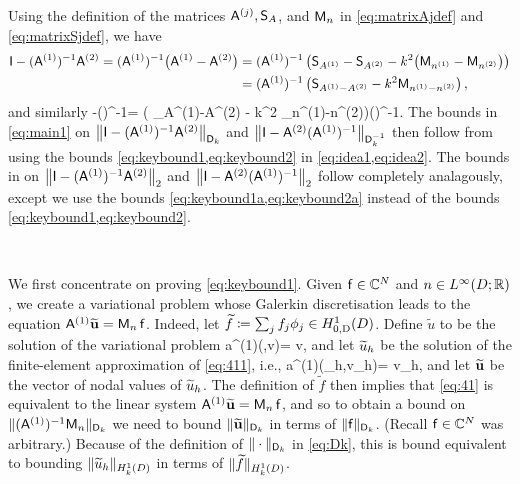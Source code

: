 Using the definition of the matrices $\mathsf{A}^{(j)}, \mathsf{S}_{A}$, and $\mathsf{M}_{n}$ in \cref{eq:matrixAjdef} and \cref{eq:matrixSjdef}, we have
\begin{align}\nonumber
\mathsf{I} - (\mathsf{A}^{(1)})^{-1}\mathsf{A}^{(2)} = (\mathsf{A}^{(1)})^{-1}\big(\mathsf{A}^{(1)}-\mathsf{A}^{(2)}\big) &=  (\mathsf{A}^{(1)})^{-1}\left( \mathsf{S}_{A^{(1)}} - \mathsf{S}_{A^{(2)}} - k^2 \big(\mathsf{M}_{n^{(1)}}-\mathsf{M}_{n^{(2)}}\big)\right)\\
&= (\mathsf{A}^{(1)})^{-1}\left( \mathsf{S}_{A^{(1)}-A^{(2)}} - k^2 \mathsf{M}_{n^{(1)}-n^{(2)}}\right),\label{eq:idea1}
\end{align}
and similarly 
\beq\label{eq:idea2}
\Imat -\Amatt  (\Amato)^{-1}= \left( \Smat_{A^{(1)}-A^{(2)}} - k^2 \Mmat_{n^{(1)}-n^{(2)}}\right)(\Amato)^{-1}.
\eeq
The bounds in  \cref{eq:main1} on $\NDk{\Imat - (\Amato)^{-1}\Amatt}$ and  $\NDkI{\Imat - \Amatt(\Amato)^{-1}}$ then follow from using the bounds \cref{eq:keybound1,eq:keybound2} in \cref{eq:idea1,eq:idea2}. The bounds in  on $\Nt{\Imat - (\Amato)^{-1}\Amatt}$ and  $\Nt{\Imat - \Amatt(\Amato)^{-1}}$ follow completely analagously, except we use the bounds \cref{eq:keybound1a,eq:keybound2a} instead of the bounds \cref{eq:keybound1,eq:keybound2}.
%
\epf

\

We first concentrate on proving \cref{eq:keybound1}.
Given $\mathsf{f} \in \mathbb C^N$ and $n\in \LiDRR$, we create a variational problem whose Galerkin discretisation leads to the equation $\mathsf{A}^{(1)} \widetilde{\mathbf{u}} = \mathsf{M}_n\,\mathsf{f}$.
Indeed, let $\widetilde{f} \de \sum_j f_j \phi_j\in \HozDD$. Define $\widetilde{u}$ to be the solution of the variational problem 
\beq\label{eq:411}
a^{(1)}(,v)=  \quad{} v\in \HozDD,
\eeq
and let $\widetilde{u}_h$ be the solution of the finite-element approximation of \cref{eq:411}, i.e.,
\beq\label{eq:41}
a^{(1)}(\tu_h,v_h)=  \quad{} v_h\in \Vhp,
\eeq
and let $\widetilde{\mathbf{u}}$ be the vector of nodal values of $\widetilde{u}_h$. The definition of $\widetilde{f}$ then implies that \cref{eq:41} is equivalent to the linear system $\mathsf{A}^{(1)} \widetilde{\mathbf{u}} = \mathsf{M}_{n}\,\mathsf{f}$, and so to obtain a bound on $\|(\mathsf{A}^{(1)})^{-1}\mathsf{M}_n\|_{\mathsf{D}_k}$ we need to bound $\|\widetilde{\mathbf{u}}\|_{\mathsf{D}_k}$ in terms of $\|\mathsf{f}\|_{\mathsf{D}_k}$. (Recall $\mathsf{f} \in \mathbb C^{N}$ was arbitrary.) Because of the definition 
of $\|\cdot\|_{\mathsf{D}_k}$ in \cref{eq:Dk}, this is bound equivalent to bounding $\|\tu_h\|_{\HokD}$ in terms of $\|\widetilde{f}\|_{\HokD}$.

